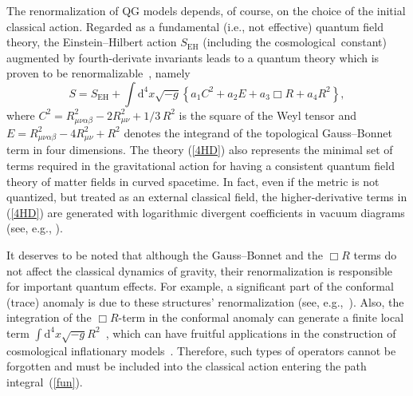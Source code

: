 \documentclass[aps,prd,a4paper,twocolumn,showpacs,showkeys,preprintnumbers,amsmath,amssymb,nofootinbib,usenames,dvipsnames]{revtex4-2}
\newcommand{\be}{\begin{eqnarray}}
\def\beq{\begin{equation}}
\def\eeq{\end{equation}}
\newcommand{\rd}{\mathrm{d}}  %
\newcommand{\eq}[1]{(\ref{#1})}
\newcommand{\n}[1]{\label{#1}}
\def\al{\alpha}
\def\be{\beta}
\begin{document}
The renormalization of QG models depends, of course, on the choice of the initial classical action. Regarded as a fundamental (i.e., not effective) quantum field theory, the Einstein--Hilbert action $S_{\text{EH}}$  (including the cosmological~constant) augmented by fourth-derivate invariants leads to a quantum theory which is proven to be renormalizable~\cite{Stelle77}, namely
\beq
\n{4HD}
S = S_{\text{EH}} +  \int \rd^4 x \sqrt{-g} \left\{
a_1 C^2 + a_2 E + a_3 \Box R + a_4 R^2
\right\},
\eeq
where $C^2 = R_{\mu\nu\al\be}^2 - 2 R_{\mu\nu}^2 + 1/3 \, R^2$ is the square of the Weyl tensor and $E = R_{\mu\nu\al\be}^2 - 4 R_{\mu\nu}^2 + R^2$ denotes the integrand of the topological Gauss--Bonnet term in four dimensions.
The theory \eq{4HD} also represents the minimal set of terms required in the gravitational action for having a consistent quantum field theory of matter fields in curved spacetime. In fact, even if the metric is not quantized, but treated as an external classical field, the higher-derivative terms in \eq{4HD}  are generated with logarithmic divergent coefficients in vacuum diagrams (see, {e.g.}, \cite{birdav,book,Shapiro:2008sf}).


It deserves to be noted that although the Gauss--Bonnet and the $\Box R$ terms do not affect the classical dynamics of gravity, their renormalization is responsible for important quantum effects. 
For example, a significant part of the conformal (trace) anomaly is due to these structures' renormalization (see, {e.g.},~\cite{birdav,book,duff94}). 
Also, the integration of the $\Box R$-term in the conformal anomaly can generate a finite local term $\int \rd^4x \sqrt{-g} R^2$~\cite{Riegert:1984kt,
Fradkin:1983tg,Asorey:2003uf}, 
which can have fruitful applications in the construction of cosmological inflationary models~\cite{star,Starobinsky:1983zz,Fabris:1998vq,Fabris:2000gz,Pelinson:2002ef,Netto:2015cba}.
Therefore, such types of operators cannot be forgotten and must be included into the classical action entering the path integral~\eq{fun}.
\end{document}
